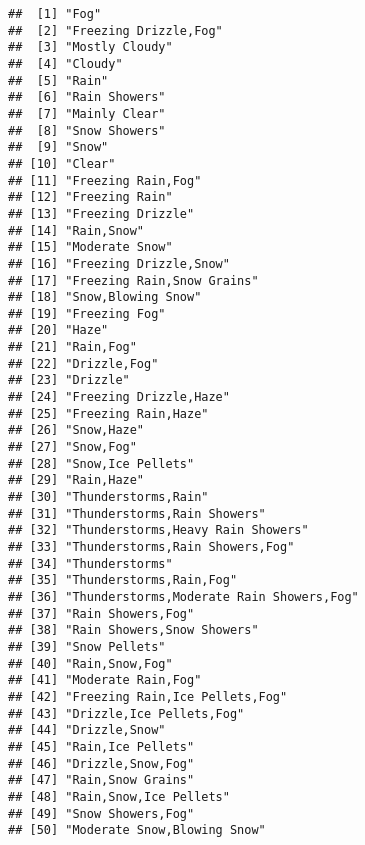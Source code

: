 \documentclass[
]{article}
\begin{document}
\begin{verbatim}
##  [1] "Fog"                                    
##  [2] "Freezing Drizzle,Fog"                   
##  [3] "Mostly Cloudy"                          
##  [4] "Cloudy"                                 
##  [5] "Rain"                                   
##  [6] "Rain Showers"                           
##  [7] "Mainly Clear"                           
##  [8] "Snow Showers"                           
##  [9] "Snow"                                   
## [10] "Clear"                                  
## [11] "Freezing Rain,Fog"                      
## [12] "Freezing Rain"                          
## [13] "Freezing Drizzle"                       
## [14] "Rain,Snow"                              
## [15] "Moderate Snow"                          
## [16] "Freezing Drizzle,Snow"                  
## [17] "Freezing Rain,Snow Grains"              
## [18] "Snow,Blowing Snow"                      
## [19] "Freezing Fog"                           
## [20] "Haze"                                   
## [21] "Rain,Fog"                               
## [22] "Drizzle,Fog"                            
## [23] "Drizzle"                                
## [24] "Freezing Drizzle,Haze"                  
## [25] "Freezing Rain,Haze"                     
## [26] "Snow,Haze"                              
## [27] "Snow,Fog"                               
## [28] "Snow,Ice Pellets"                       
## [29] "Rain,Haze"                              
## [30] "Thunderstorms,Rain"                     
## [31] "Thunderstorms,Rain Showers"             
## [32] "Thunderstorms,Heavy Rain Showers"       
## [33] "Thunderstorms,Rain Showers,Fog"         
## [34] "Thunderstorms"                          
## [35] "Thunderstorms,Rain,Fog"                 
## [36] "Thunderstorms,Moderate Rain Showers,Fog"
## [37] "Rain Showers,Fog"                       
## [38] "Rain Showers,Snow Showers"              
## [39] "Snow Pellets"                           
## [40] "Rain,Snow,Fog"                          
## [41] "Moderate Rain,Fog"                      
## [42] "Freezing Rain,Ice Pellets,Fog"          
## [43] "Drizzle,Ice Pellets,Fog"                
## [44] "Drizzle,Snow"                           
## [45] "Rain,Ice Pellets"                       
## [46] "Drizzle,Snow,Fog"                       
## [47] "Rain,Snow Grains"                       
## [48] "Rain,Snow,Ice Pellets"                  
## [49] "Snow Showers,Fog"                       
## [50] "Moderate Snow,Blowing Snow"
\end{verbatim}
\end{document}
